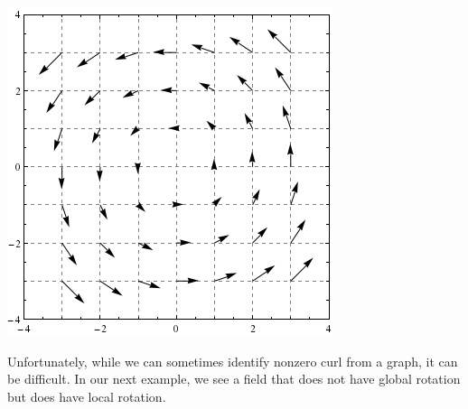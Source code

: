 \documentclass{ximera}
\begin{document}
\begin{image}
  \includegraphics{rotField.png}
\end{image}
Unfortunately, while we can sometimes identify nonzero curl from a
graph, it can be difficult. In our next example, we see a field that
does not have global rotation but does have local rotation.
\end{document}
